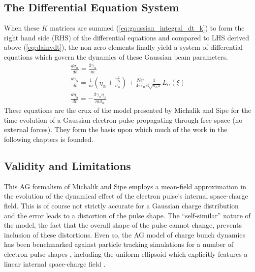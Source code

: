 \subsection{The Differential Equation System}

When these $K$ matrices are summed (\ref{eq:gaussian_integral_dt_k}) to form the right hand side (RHS) of the differential equations and compared to LHS derived above (\ref{eq:dainvdt}), the non-zero elements finally yield a system of differential equations which govern the dynamics of these Gaussian beam parameters.
\begin{subequations} \label{eq:ag_original}
\begin{gather}
  \frac{d\sigma_{\alpha}}{dt} = \frac{2\gamma_{\alpha}}{m} \\
  \frac{d\gamma_{\alpha}}{dt} = \frac{1}{m} \left(\eta_{\alpha} + \frac{\gamma_{\alpha}^2}{\sigma_{\alpha}} \right) 
    + \frac{N e^2}{4\pi\varepsilon_0} \frac{1}{6 \sqrt{\sigma_{\alpha}\pi}} L_{\alpha}(\xi)\\
  \frac{d\eta_{\alpha}}{dt} = - \frac{2 \gamma_{\alpha} \eta_{\alpha}}{m \sigma_{\alpha}}
\end{gather}
\end{subequations}
These equations are the crux of the model presented by Michalik and Sipe for the time evolution of a Gaussian electron pulse propagating through free space (no external forces).
They form the basis upon which much of the work in the following chapters is founded.

\subsection{Validity and Limitations}

This AG formalism of Michalik and Sipe \cite{michalik_analytic_2006} employs a mean-field approximation in the evolution of the dynamical effect of the electron pulse's internal space-charge field.
This is of course not strictly accurate for a Gaussian charge distribution and the error leads to a distortion of the pulse shape.
The ``self-similar'' nature of the model, the fact that the overall shape of the pulse cannot change, prevents inclusion of these distortions.
Even so, the AG model of charge bunch dynamics has been benchmarked against particle tracking simulations for a number of electron pulse shapes \cite{michalik_analytic_2006,michalik_evolution_2009}, including the uniform ellipsoid which explicitly features a linear internal space-charge field \cite{luiten_how_2004}.

